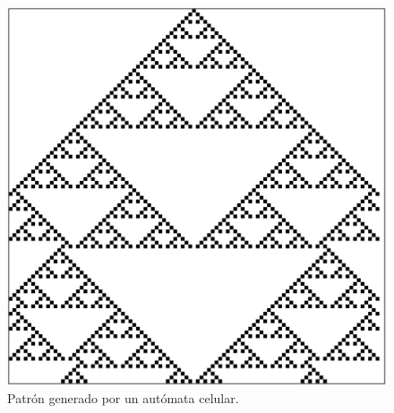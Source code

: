     \begin{figure}[h!]
      \centering
        \includegraphics[scale=0.4]{./images/CellularAutomata}
        \caption{Patrón generado por un autómata celular.} 
    \end{figure}

